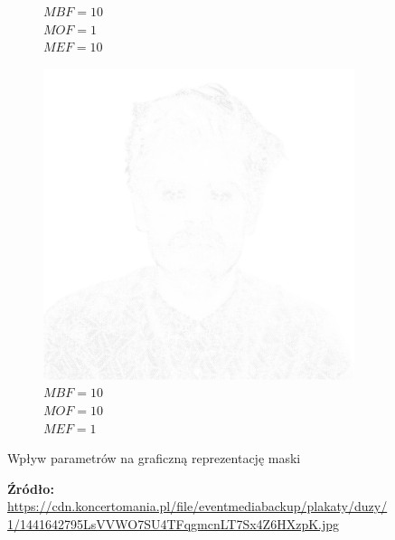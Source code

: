 \begin{figure}[H]
\begin{subfigure}{0.32\textwidth}
        \caption{\(MBF = 10\) \\ \(MOF = 1\) \\ \(MEF = 10\)}
        \label{mine-param-taco-h}
    \end{subfigure}
    \begin{subfigure}{0.32\textwidth}
        \centering
        \includegraphics[width = \textwidth]{img/4-mine/taco-mask/taco_mask_c20_inv0_bg10_obj10_ed1.png}
        \caption{\(MBF = 10\) \\ \(MOF = 10\) \\ \(MEF = 1\)}
        \label{mine-param-taco-i}
    \end{subfigure}
    \caption{Wpływ parametrów na graficzną reprezentację maski}
    \caption*{\footnotesize{\textbf{Źródło:} {\url{https://cdn.koncertomania.pl/file/eventmediabackup/plakaty/duzy/1/1441642795LsVVWO7SU4TFqgmcnLT7Sx4Z6HXzpK.jpg}}}}
    \label{mine-param-taco}
    \end{figure}
    
